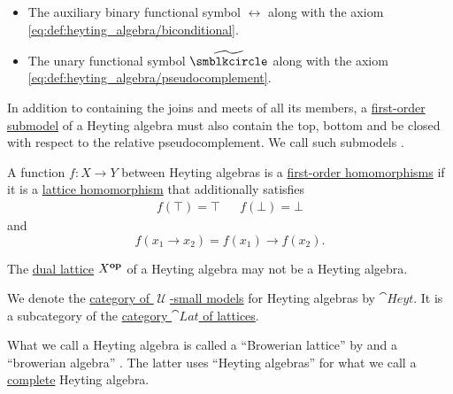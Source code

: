 \begin{definition}
\begin{thmenum}[resume=def:heyting_algebra]
\begin{itemize}
      \item The auxiliary binary functional symbol \( \leftrightarrow \) along with the axiom \eqref{eq:def:heyting_algebra/biconditional}.

      \item The unary functional symbol \( {\widetilde {\anon}} \) along with the axiom \eqref{eq:def:heyting_algebra/pseudocomplement}.
    \end{itemize}

     In addition to containing the joins and meets of all its members, a \hyperref[def:first_order_submodel]{first-order submodel} of a Heyting algebra must also contain the top, bottom and be closed with respect to the relative pseudocomplement. We call such submodels .

     A function \( f: X \to Y \) between Heyting algebras is a \hyperref[def:first_order_homomorphism]{first-order homomorphisms} if it is a \hyperref[def:lattice/homomorphism]{lattice homomorphism} that additionally satisfies
    \begin{align}\label{eq:def:heyting_algebra/homomorphism/top_bottom}
      f(\top) = \top
      &&
      f(\bot) = \bot
    \end{align}
    and
    \begin{equation}\label{eq:def:heyting_algebra/homomorphism/operation}
      f(x_1 \rightarrow x_2) = f(x_1) \rightarrow f(x_2).
    \end{equation}

     The \hyperref[def:lattice/opposite]{dual lattice} \( X^\oppos \) of a Heyting algebra may not be a Heyting algebra.

     We denote the \hyperref[def:category_of_small_first_order_models]{category of \( \mscrU \)-small models} for Heyting algebras by \( \cat{Heyt} \). It is a subcategory of the \hyperref[def:lattice/category]{category \( \cat{Lat} \) of lattices}.
  \end{thmenum}
\end{definition}
\begin{comments}
  \item What we call a Heyting algebra is called a \enquote{Browerian lattice} by  and a \enquote{browerian algebra} . The latter uses \enquote{Heyting algebras} for what we call a \hyperref[def:complete_lattice]{complete} Heyting algebra.
\end{comments}
